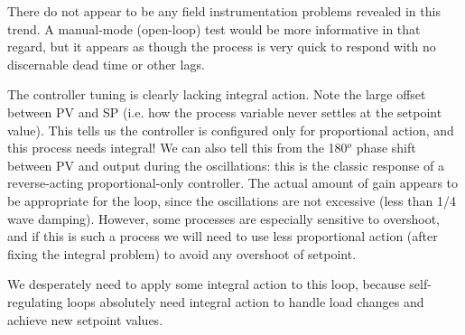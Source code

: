 \vskip 10pt

There do not appear to be any field instrumentation problems revealed in this trend.  A manual-mode (open-loop) test would be more informative in that regard, but it appears as though the process is very quick to respond with no discernable dead time or other lags.

\vskip 10pt
  
The controller tuning is clearly lacking integral action.  Note the large offset between PV and SP (i.e. how the process variable never settles at the setpoint value).  This tells us the controller is configured only for proportional action, and this process needs integral!  We can also tell this from the 180$^{o}$ phase shift between PV and output during the oscillations: this is the classic response of a reverse-acting proportional-only controller.  The actual amount of gain appears to be appropriate for the loop, since the oscillations are not excessive (less than 1/4 wave damping).  However, some processes are especially sensitive to overshoot, and if this is such a process we will need to use less proportional action (after fixing the integral problem) to avoid any overshoot of setpoint.

\vskip 10pt

We desperately need to apply some integral action to this loop, because self-regulating loops absolutely need integral action to handle load changes and achieve new setpoint values.











